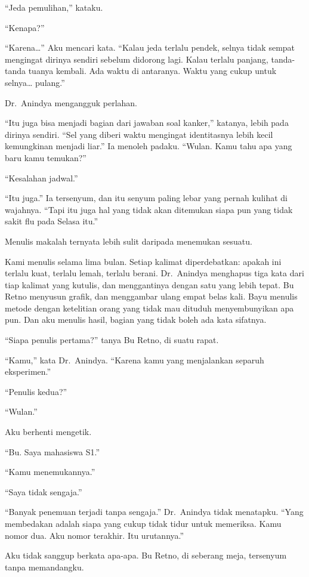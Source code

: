 \documentclass[11pt,twoside,openany]{book}
\makeatletter
\newcommand{\scenebreak}{\par\vspace{0.9em}{\centering\textsc{*\hspace{0.7em}*\hspace{0.7em}*}\par}\vspace{0.9em}\@afterindentfalse\@afterheading}
\makeatother
\begin{document}
``Jeda pemulihan,'' kataku.

``Kenapa?''

``Karena\ldots{}'' Aku mencari kata. ``Kalau jeda terlalu pendek, selnya tidak sempat mengingat dirinya sendiri sebelum didorong lagi. Kalau terlalu panjang, tanda-tanda tuanya kembali. Ada waktu di antaranya. Waktu yang cukup untuk selnya\ldots{} pulang.''

Dr.~Anindya mengangguk perlahan.

``Itu juga bisa menjadi bagian dari jawaban soal kanker,'' katanya, lebih pada dirinya sendiri. ``Sel yang diberi waktu mengingat identitasnya lebih kecil kemungkinan menjadi liar.'' Ia menoleh padaku. ``Wulan. Kamu tahu apa yang baru kamu temukan?''

``Kesalahan jadwal.''

``Itu juga.'' Ia tersenyum, dan itu senyum paling lebar yang pernah kulihat di wajahnya. ``Tapi itu juga hal yang tidak akan ditemukan siapa pun yang tidak sakit flu pada Selasa itu.''

\scenebreak
Menulis makalah ternyata lebih sulit daripada menemukan sesuatu.

Kami menulis selama lima bulan. Setiap kalimat diperdebatkan: apakah ini terlalu kuat, terlalu lemah, terlalu berani. Dr.~Anindya menghapus tiga kata dari tiap kalimat yang kutulis, dan menggantinya dengan satu yang lebih tepat. Bu Retno menyusun grafik, dan menggambar ulang empat belas kali. Bayu menulis metode dengan ketelitian orang yang tidak mau dituduh menyembunyikan apa pun. Dan aku menulis hasil, bagian yang tidak boleh ada kata sifatnya.

``Siapa penulis pertama?'' tanya Bu Retno, di suatu rapat.

``Kamu,'' kata Dr.~Anindya. ``Karena kamu yang menjalankan separuh eksperimen.''

``Penulis kedua?''

``Wulan.''

Aku berhenti mengetik.

``Bu. Saya mahasiswa S1.''

``Kamu menemukannya.''

``Saya tidak sengaja.''

``Banyak penemuan terjadi tanpa sengaja.'' Dr.~Anindya tidak menatapku. ``Yang membedakan adalah siapa yang cukup tidak tidur untuk memeriksa. Kamu nomor dua. Aku nomor terakhir. Itu urutannya.''

Aku tidak sanggup berkata apa-apa. Bu Retno, di seberang meja, tersenyum tanpa memandangku.
\end{document}
